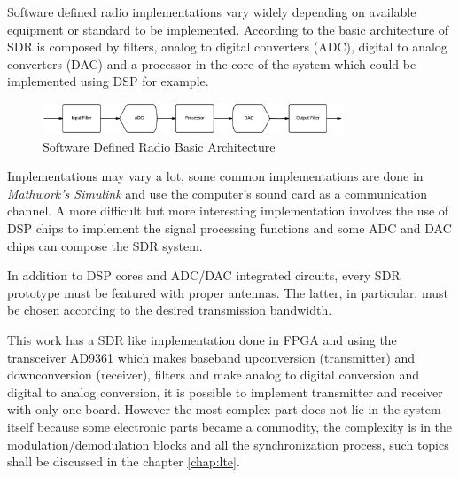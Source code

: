 Software defined radio implementations vary widely depending on available
equipment or standard to be implemented. According to \cite{ladimer2009} the basic
architecture of SDR is composed by filters, analog to digital converters (ADC),
digital to analog converters (DAC) and a processor in the core of the system
which could be implemented using DSP for example.

\begin{figure}[htbp]
    \centering
    \includegraphics[width=0.8\textwidth]{./figures/sdr_basic_arch}
    \caption{ Software Defined Radio Basic Architecture
    \label{fig:sdr_basic}}
\end{figure}


Implementations may vary a lot, some common implementations are done in
\textit{Mathwork's Simulink} and use the computer’s sound card as a
communication channel. A more difficult but more interesting implementation
involves the use of DSP chips to implement the signal processing functions and
some ADC and DAC chips can compose the SDR system.

In addition to DSP cores and ADC/DAC integrated circuits, every SDR prototype
must be featured with proper antennas. The latter, in particular, must be
chosen according to the desired transmission bandwidth.

%

This work has a SDR like implementation done in FPGA and using the transceiver
AD9361 which makes baseband upconversion (transmitter) and downconversion
(receiver), filters and make analog to digital conversion and digital to analog
conversion, it is possible to implement transmitter and receiver with only
one board. However the most complex part does not lie in the system itself
because some electronic parts became a commodity, the complexity is in the
modulation/demodulation blocks and all the synchronization process, such topics
shall be discussed in the chapter \ref{chap:lte}.
